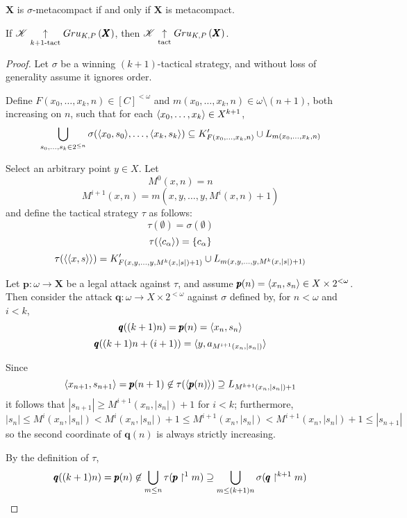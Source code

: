 \begin{cor}
  $\pmb X$ is $\sigma$-metacompact if and only if $\pmb X$ is metacompact.
\end{cor}

\begin{lem}
  If $\mathscr{K}\underset{k+1\text{-tact}}{\uparrow}Gru_{K,P}\left({\pmb X}\right)$, then
  $\mathscr{K}\underset{\text{tact}}{\uparrow}Gru_{K,P}\left({\pmb X}\right)$.
\end{lem}

\begin{proof}
  Let $\sigma$ be a winning $(k+1)$-tactical strategy, and without loss of
  generality assume it ignores order.

  Define $F(x_0,\dots,x_{k},n)\in [C]^{<\omega}$ and
  $m(x_0,\dots,x_{k},n)\in\omega\setminus(n+1)$, both increasing on $n$,
  such that for each $\langle x_0,\dots,x_{k}\rangle\in X^{k+1}$,
  \[
    \bigcup_{s_0,\dots,s_k \in 2^{\leq n}}
    \sigma(\langle x_0,s_0\rangle,\dots,\langle x_{k},s_{k}\rangle)
      \subseteq
    K'_{F(x_0,\dots,x_{k},n)} \cup L_{m(x_0,\dots,x_{k},n)}
  \]

  Select an arbitrary point $y \in X$.
  Let
    \[
      M^0(x,n)=n
    \]
    \[
      M^{i+1}(x,n)=m(x,y,\dots,y,M^i(x,n)+1)
    \]
  and define the tactical strategy $\tau$ as follows:
  \[
    \tau(\emptyset)
      =
    \sigma(\emptyset)
  \]
  \[
    \tau(\langle c_\alpha\rangle)
      =
    \{c_\alpha\}
  \]
  \[
    \tau(\langle\langle x,s\rangle\rangle)
      =
    K'_{F(x,y,\dots,y,M^k(x,|s|)+1)}
      \cup
    L_{m(x,y,\dots,y,M^k(x,|s|)+1)}
  \]

  Let $\pmb p:\omega\to \pmb X$ be a legal attack against
  $\tau$, and assume $\pmb p(n)=\langle x_n,s_n\rangle\in X\times 2^{<\omega}$.
  Then consider the attack $\pmb q:\omega\to X\times 2^{<\omega}$ against
  $\sigma$ defined by, for $n<\omega$ and $i<k$,
    \[
      \pmb q((k+1)n)=\pmb p(n)=\langle x_n,s_n\rangle
    \]
    \[
      \pmb q((k+1)n+(i+1))=\langle y, a_{M^{i+1}(x_n,|s_n|)}\rangle
    \]

  Since
    \[
      \langle x_{n+1},s_{n+1}\rangle
        =
      \pmb p(n+1)
        \not\in
      \tau(\langle\pmb p(n)\rangle)
        \supseteq
      L_{M^{k+1}(x_n,|s_n|)+1}
    \]
  it follows that
  $|s_{n+1}|\geq M^{i+1}(x_n,|s_n|)+1$ for $i<k$; furthermore,
    \[
      |s_n|
        \leq
      M^i(x_n,|s_n|)
        <
      M^i(x_n,|s_n|)+1
        \leq
      M^{i+1}(x_n,|s_n|)
        <
      M^{i+1}(x_n,|s_n|)+1
        \leq
      |s_{n+1}|
    \]
  so the second coordinate of $\pmb q(n)$ is always strictly increasing.

  By the definition of $\tau$,
    \[
      \pmb q((k+1)n)
        =
      \pmb p(n)
        \not\in
      \bigcup_{m\leq n}
      \tau(\pmb p\restriction^1 m)
        \supseteq
      \bigcup_{m\leq (k+1)n}
      \sigma(\pmb q\restriction^{k+1} m)
    \]


\end{proof}

